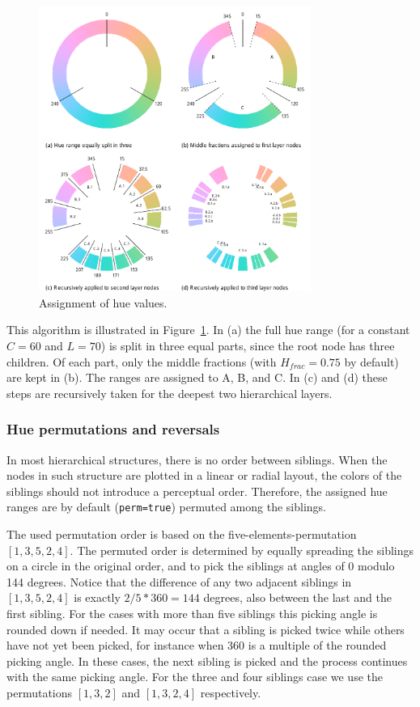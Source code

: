\documentclass[review,journal]{vgtc}         %
\begin{document}
\begin{figure}[tb]
  \centering
  \includegraphics[width=3.5in]{hcl_method2.pdf}
  \caption{Assignment of hue values.}\label{fig:wheel}
\end{figure}

This algorithm is illustrated in Figure~\ref{fig:wheel}. In (a) the full hue range (for a constant $C=60$ and $L=70$)  is split in three equal parts, since the root node has three children. Of each part, only the middle fractions (with $H_{frac}=0.75$ by default) are kept in (b). The ranges are assigned to A, B, and C. In (c) and (d) these steps are recursively taken for the deepest two hierarchical layers.

\subsubsection{Hue permutations and reversals}

In most hierarchical structures, there is no order between siblings. 
When the nodes in such structure are plotted in a linear or radial layout, 
the colors of the siblings should not introduce a perceptual order. Therefore, the assigned hue 
ranges are by default (\texttt{perm=true}) permuted among the siblings. 


The used permutation order is based on the five-elements-permutation $[1, 3, 5, 2, 4]$. The permuted order is determined by equally spreading the siblings on a circle in the original order, and to pick the siblings at angles of 0 modulo 144 degrees. Notice that the difference of any two adjacent siblings in $[1, 3, 5, 2, 4]$ is exactly $2/5 * 360=144$ degrees, also between the last and the first sibling. For the cases with more than five siblings this picking angle is rounded down if needed. It may occur that a sibling is picked twice while others have not yet been picked, for instance when 360 is a multiple of the rounded picking angle. In these cases, the next sibling is picked and the process continues with the same picking angle. For the three and four siblings case we use the permutations $[1, 3, 2]$ and $[1, 3, 2, 4]$ respectively. 
\end{document}
